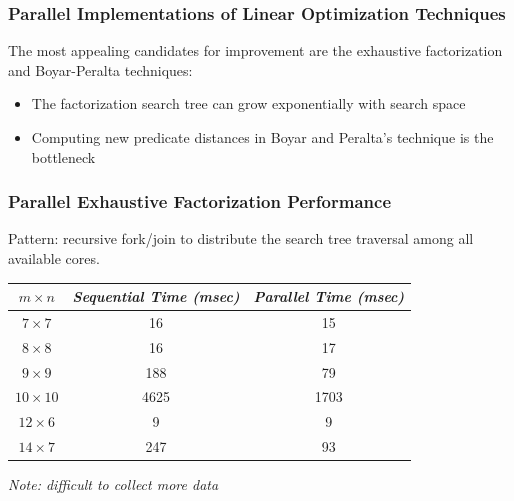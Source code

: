 \documentclass[handout,10pt]{beamer}
\begin{document}
\begin{frame}
	\frametitle{Parallel Implementations of Linear Optimization Techniques}
	The most appealing candidates for improvement are the exhaustive factorization and Boyar-Peralta techniques:
	\begin{itemize}
		\item The factorization search tree can grow exponentially with search space
		\item Computing new predicate distances in Boyar and Peralta's technique is the bottleneck
	\end{itemize}
\end{frame}

\begin{frame}
	\frametitle{Parallel Exhaustive Factorization Performance}
Pattern: recursive fork/join to distribute the search tree traversal among all available cores.
\begin{table}[h]
\begin{center}
	\begin{tabular}{| c | c | c |} \hline
	$m \times n$ & \emph{Sequential Time (msec)} & \emph{Parallel Time (msec)} \\ \hline
	$7 \times 7$ & 16 & 15 \\ 
	$8 \times 8$ & 16 & 17 \\ 
	$9 \times 9$ & 188 & 79 \\ 
	$10 \times 10$ & 4625 & 1703 \\ 
	$12 \times 6$ & 9 & 9 \\
	$14 \times 7$ & 247 & 93 \\ \hline
	\end{tabular}
\end{center}
\end{table}

\begin{center}
	\emph{Note: difficult to collect more data}
\end{center}

\end{frame}
\end{document}
